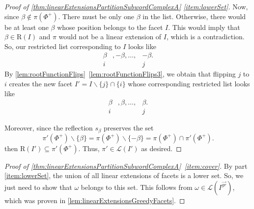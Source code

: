 \documentclass[reqno]{amsart}
\theoremstyle{definition}
\newcommand{\ssm}{\smallsetminus} %
\newcommand{\linearExtensions}{\mathcal{L}} %
\newcommand{\Roots}{\mathrm{R}} %
\newcommand{\antiGreedyFacet}{I^{\overrightarrow{gr}}} %
\begin{document}
\begin{proof}[Proof of \cref{thm:linearExtensionsPartitionSubwordComplexA} \eqref{item:lowerSet}]
Now, since $\beta\notin \pi(\Phi^+)$.
There must be only one $\beta$ in the list.
Otherwise, there would be at least one $\beta$ whose position belongs to the facet $I$.
This would imply that $\beta\in \Roots(I)$ and $\pi$ would not be a linear extension of $I$, which is a contradiction.
So, our restricted list corresponding to $I$ looks like
\[
\begin{array}{ccc}
  \beta &, -\beta, \dots, &-\beta.\\
      i && j
\end{array}
\]
By  \cref{lem:rootFunctionFlips}~\eqref{lem:rootFunctionFlips3}, we obtain that flipping $j$ to $i$ creates the new facet $I' = I \ssm \{j\} \cap \{i\}$ whose corresponding restricted list looks like
\[
\begin{array}{ccc}
  \beta &, \beta, \dots, &\beta.\\
      i && j
\end{array}    
\]

Moreover, since the reflection $s_\beta$ preserves the set 
\[
\pi'(\Phi^+) \ssm \{\beta\} = \pi(\Phi^+) \ssm \{-\beta\} = \pi(\Phi^+) \cap \pi'(\Phi^+).
\]
then $\Roots(I') \subseteq \pi'(\Phi^+)$.
Thus, $\pi'\in \linearExtensions(I')$ as desired.
\end{proof}

\begin{proof}[Proof of \cref{thm:linearExtensionsPartitionSubwordComplexA}~\eqref{item:cover}]
By part \eqref{item:lowerSet}, the union of all linear extensions of facets is a lower set.
So, we just need to show that $\omega$ belongs to this set.
This follows from $\omega\in \linearExtensions(\antiGreedyFacet)$, which was proven in \cref{lem:linearExtensionsGreedyFacets}.
\end{proof}
\end{document}
